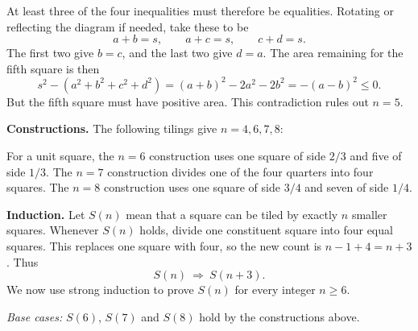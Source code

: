 \documentclass[11pt,a4paper]{article}
\begin{document}
At least three of the four inequalities must therefore be equalities. Rotating or reflecting the diagram if needed, take these to be
\[
a+b=s,\qquad a+c=s,\qquad c+d=s.
\]
The first two give $b=c$, and the last two give $d=a$. The area remaining for the fifth square is then
\[
s^2-(a^2+b^2+c^2+d^2)
=(a+b)^2-2a^2-2b^2
=-(a-b)^2\leq0.
\]
But the fifth square must have positive area. This contradiction rules out $n=5$.

\textbf{Constructions.}
The following tilings give $n=4,6,7,8$:
\begin{center}
\end{center}
For a unit square, the $n=6$ construction uses one square of side $2/3$ and five of side $1/3$. The $n=7$ construction divides one of the four quarters into four squares. The $n=8$ construction uses one square of side $3/4$ and seven of side $1/4$.

\textbf{Induction.}
Let $S(n)$ mean that a square can be tiled by exactly $n$ smaller squares. Whenever $S(n)$ holds, divide one constituent square into four equal squares. This replaces one square with four, so the new count is $n-1+4=n+3$. Thus
\[
S(n)\ \Longrightarrow\ S(n+3).
\]
We now use strong induction to prove $S(n)$ for every integer $n\geq6$.

\textit{Base cases:} $S(6)$, $S(7)$ and $S(8)$ hold by the constructions above.
\end{document}
